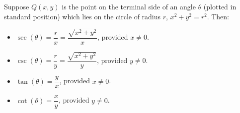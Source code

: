\colorbox{ResultColor}{\bbm

\begin{thm} \label{circularfunctionscircle} Suppose $Q(x,y)$ is the point on the terminal side of an angle $\theta$ (plotted in standard position) which lies on the circle of radius $r$,  $x^2+y^2 = r^2$. Then:

\begin{itemize}

\item $\sec(\theta) = \dfrac{r}{x} = \dfrac{\sqrt{x^2+y^2}}{x}$, provided $x \neq 0$. 

\item $\csc(\theta) = \dfrac{r}{y} = \dfrac{\sqrt{x^2+y^2}}{y}$, provided $y \neq 0$. 

\item $\tan(\theta) = \dfrac{y}{x}$, provided $x \neq 0$. 

\item $\cot(\theta) = \dfrac{x}{y}$, provided $y \neq 0$. 

\end{itemize}

\end{thm}

\ebm}

\pagebreak

